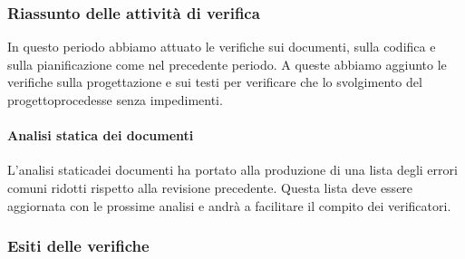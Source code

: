 \subsubsection{Riassunto delle attività di verifica}
In questo periodo abbiamo attuato le verifiche sui documenti, sulla codifica e sulla pianificazione come nel precedente periodo. A queste abbiamo aggiunto le verifiche sulla progettazione e sui testi per verificare che lo svolgimento del progetto\glosp procedesse senza impedimenti.  
\paragraph{Analisi statica dei documenti}
L'analisi statica\glosp dei documenti ha portato alla produzione di una lista degli errori comuni ridotti rispetto alla revisione precedente. Questa lista deve essere aggiornata con le prossime analisi e andrà a facilitare il compito dei verificatori.
\subsubsection{Esiti delle verifiche} 
